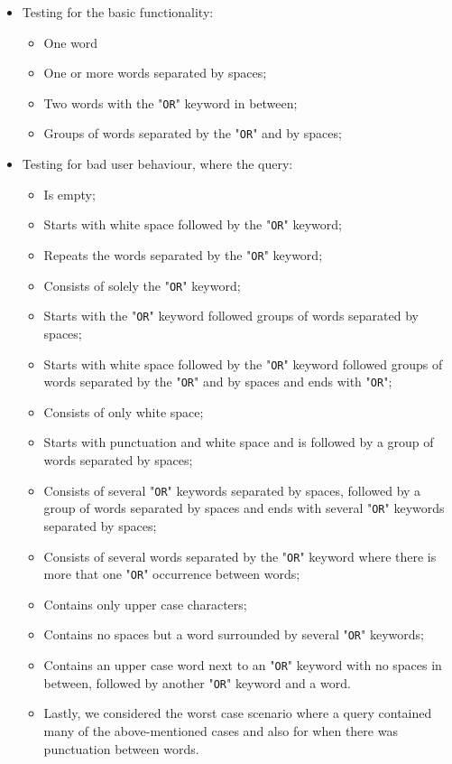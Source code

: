 \begin{itemize}
\item Testing for the basic functionality:
\begin{itemize}
\item One word
\item One or more words separated by spaces;
\item Two words with the "{\tt OR}" keyword in between;
\item Groups of words separated by the "{\tt OR}" and by spaces;
\end{itemize}
\item Testing for bad user behaviour, where the query:
\begin{itemize}
\item Is empty;
\item Starts with white space followed by the "{\tt OR}" keyword;
\item Repeats the words separated by the "{\tt OR}" keyword;
\item Consists of solely the "{\tt OR}" keyword;
\item Starts with the "{\tt OR}" keyword followed groups of words separated by spaces;
\item Starts with white space followed by the "{\tt OR}" keyword followed groups of words separated by the "{\tt OR}" and by spaces and ends with "{\tt OR}";
\item Consists of only white space;
\item Starts with punctuation and white space and is followed by a group of words separated by spaces;
\item Consists of several "{\tt OR}" keywords separated by spaces, followed by a group of words separated by spaces and ends with several "{\tt OR}" keywords separated by spaces;
\item Consists of several words separated by the "{\tt OR}" keyword where there is more that one "{\tt OR}" occurrence between words;
\item Contains only upper case characters;
\item Contains no spaces but a word surrounded by several "{\tt OR}" keywords;
\item Contains an upper case word next to an "{\tt OR}" keyword with no spaces in between, followed by another "{\tt OR}" keyword and a word.
\item Lastly, we considered the worst case scenario where a query contained many of the above-mentioned cases and also for when there was punctuation between words.
\end{itemize}
\end{itemize}


